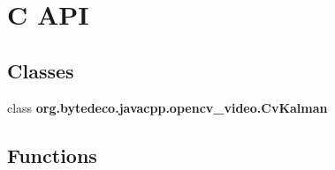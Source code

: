 \hypertarget{group__video__c}{}\section{C A\+PI}
\label{group__video__c}
\subsection*{Classes}
\begin{DoxyCompactItemize}
\item 
class {\bfseries org.\+bytedeco.\+javacpp.\+opencv\+\_\+video.\+Cv\+Kalman}
\end{DoxyCompactItemize}
\subsection*{Functions}

